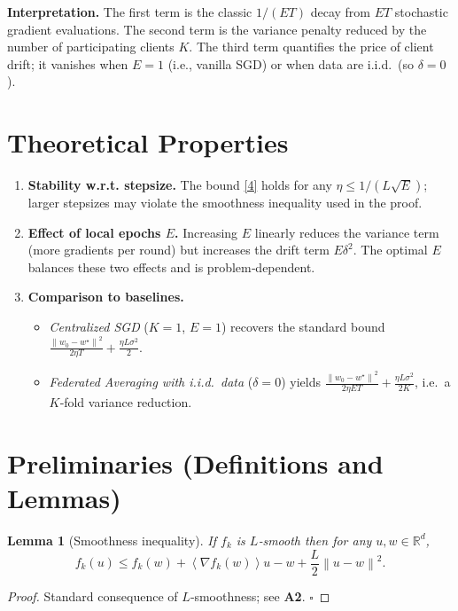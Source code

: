 \documentclass{article}
\newtheorem{lemma}{Lemma}
\newcommand{\R}{\mathbb{R}}
\newcommand{\norm}[1]{\left\lVert #1\right\rVert}
\newcommand{\inner}[1]{\left\langle #1\right\rangle}
\begin{document}
\medskip
\noindent\textbf{Interpretation.}  
The first term is the classic $1/(ET)$ decay from $ET$ stochastic gradient evaluations.  
The second term is the variance penalty reduced by the number of participating clients $K$.  
The third term quantifies the price of client drift; it vanishes when $E=1$ (i.e., vanilla SGD) or when data are i.i.d.\ (so $\delta=0$).

\section*{Theoretical Properties}
\begin{enumerate}[label={P\arabic*}.]
\item \textbf{Stability w.r.t. stepsize.}  The bound \eqref{4} holds for any $\eta\le 1/(L\sqrt{E})$; larger stepsizes may violate the smoothness inequality used in the proof.

\item \textbf{Effect of local epochs $E$.}  Increasing $E$ linearly reduces the variance term (more gradients per round) but increases the drift term $E\delta^2$. The optimal $E$ balances these two effects and is problem‑dependent.

\item \textbf{Comparison to baselines.}
\begin{itemize}
\item \emph{Centralized SGD} ($K=1$, $E=1$) recovers the standard bound $\frac{\norm{w_0-w^\star}^2}{2\eta T}+\frac{\eta L\sigma^2}{2}$.
\item \emph{Federated Averaging with i.i.d.\ data} ($\delta=0$) yields $\frac{\norm{w_0-w^\star}^2}{2\eta ET}+\frac{\eta L\sigma^2}{2K}$, i.e.\ a $K$‑fold variance reduction.
\end{itemize}
\end{enumerate}

\section*{Preliminaries (Definitions and Lemmas)}
\begin{lemma}[Smoothness inequality]\label{lem:smooth}
If $f_k$ is $L$‑smooth then for any $u,w\in\R^d$,
\[
f_k(u)\le f_k(w)+\inner{\nabla f_k(w)}{u-w}+\frac{L}{2}\norm{u-w}^2 .
\tag{L1}
\]
\end{lemma}
\begin{proof}
Standard consequence of $L$‑smoothness; see \textbf{A2}. \hfill $\square$
\end{proof}
\end{document}
